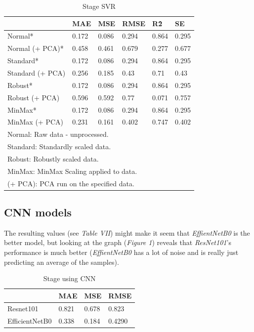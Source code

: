 \documentclass[conference]{IEEEtran}
\begin{document}
\begin{table}[H]
    \centering
    \caption{Stage SVR}
    \begin{adjustbox}{width=\columnwidth,center}
    \begin{tabular}{llllll}
        ~ & MAE & MSE & RMSE & R\^2 & SE \\ \hline
        Normal* & 0.172 & 0.086 & 0.294 & 0.864 & 0.295 \\ 
        Normal (+ PCA)* & 0.458 & 0.461 & 0.679 & 0.277 & 0.677 \\ 
        Standard* & 0.172 & 0.086 & 0.294 & 0.864 & 0.295 \\ 
        Standard (+ PCA) & 0.256 & 0.185 & 0.43 & 0.71 & 0.43 \\ 
        Robust*  & 0.172 & 0.086 & 0.294 & 0.864 & 0.295 \\ 
        Robust (+ PCA) & 0.596 & 0.592 & 0.77 & 0.071 & 0.757 \\ 
        MinMax*  & 0.172 & 0.086 & 0.294 & 0.864 & 0.295 \\ 
        MinMax (+ PCA) & 0.231 & 0.161 & 0.402 & 0.747 & 0.402 \\ 
        \bottomrule
        \multicolumn{6}{l}{\footnotesize *Normal: Raw data - unprocessed.}\\
        \multicolumn{6}{l}{\footnotesize *Standard: Standardly scaled data.}\\
        \multicolumn{6}{l}{\footnotesize *Robust: Robustly scaled data.}\\
        \multicolumn{6}{l}{\footnotesize *MinMax: MinMax Scaling applied to data.}\\
        \multicolumn{6}{l}{\footnotesize *(+ PCA): PCA run on the specified data.}\\
    \end{tabular}
    \end{adjustbox}
\end{table}

\subsection{\textbf{CNN models}}
The resulting values (see \textit{Table VII}) might make it seem that \textit{EffientNetB0} is the better model, but looking at the graph (\textit{Figure 1}) reveals that \textit{ResNet101}'s performance is much better (\textit{EffientNetB0} has a lot of noise and is really just predicting an average of the samples).

\begin{table}[H]
    \centering
    \caption{Stage using CNN}
    \begin{tabular}{llll}
        ~ & MAE & MSE & RMSE \\ \hline
        Resnet101 & 0.821 & 0.678 & 0.823 \\ 
        EfficientNetB0 &  0.338 & 0.184 & 0.4290 \\
    \end{tabular}
\end{table}
\end{document}

